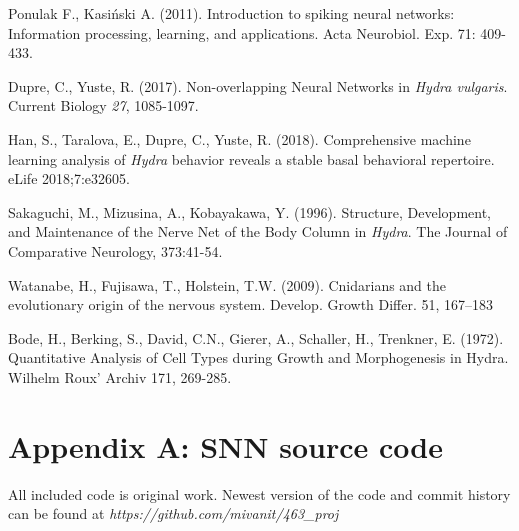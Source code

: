 \documentclass{article}
\begin{document}




\newpage

\begin{thebibliography}{6}
    Ponulak F., Kasiński A. (2011).
    Introduction to spiking neural networks: Information processing, learning, and applications.
    Acta Neurobiol. Exp. 71: 409-433.
  
    Dupre, C., Yuste, R. (2017). Non-overlapping Neural Networks in \textit{Hydra vulgaris}. Current Biology \textit{27}, 1085-1097.
    
    Han, S., Taralova, E., Dupre, C., Yuste, R. (2018).
    Comprehensive machine learning analysis of \textit{Hydra} behavior reveals a stable basal behavioral repertoire.
    eLife 2018;7:e32605.
    
    Sakaguchi, M., Mizusina, A., Kobayakawa, Y. (1996).
    Structure, Development, and Maintenance of the Nerve Net of the Body Column in \textit{Hydra}.
    The Journal of Comparative Neurology, 373:41-54.
    
    Watanabe, H., Fujisawa, T., Holstein, T.W. (2009).
    Cnidarians and the evolutionary origin of the nervous system.
    Develop. Growth Differ. 51, 167–183
    
    Bode, H., Berking, S., David, C.N., Gierer, A., Schaller, H., Trenkner, E. (1972).
    Quantitative Analysis of Cell Types during Growth and Morphogenesis in Hydra.
    Wilhelm Roux' Archiv 171, 269-285.

\end{thebibliography}
\newpage

\section*{Appendix A: SNN source code}
All included code is original work. Newest version of the code and commit history can be found at \emph{https://github.com/mivanit/463_proj}
\end{document}
